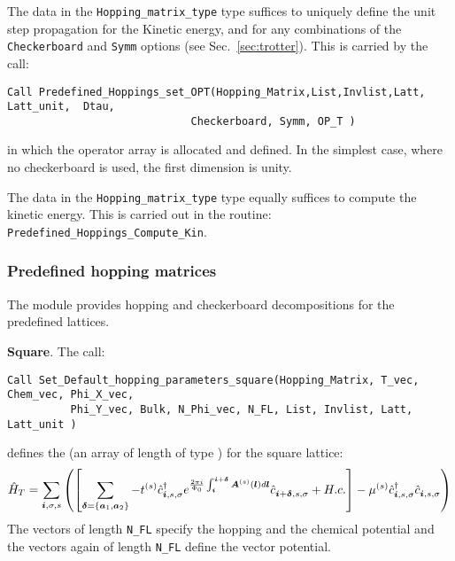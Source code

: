 The  data in the \texttt{Hopping\_matrix\_type} type suffices to uniquely define the  unit step propagation    for the Kinetic energy, and for  any combinations of the  \texttt{Checkerboard} and  \texttt{Symm}  options (see Sec.~\ref{sec:trotter}).   This is carried  by the call: 
\begin{lstlisting}[style=fortran]
Call Predefined_Hoppings_set_OPT(Hopping_Matrix,List,Invlist,Latt,  Latt_unit,  Dtau, 
                             Checkerboard, Symm, OP_T )
\end{lstlisting}
in which  the  operator   array     is  allocated and defined.    In the simplest  case, where no  checkerboard is  used, the  first dimension  is  unity. 

The   data in  the \texttt{Hopping\_matrix\_type} type   equally  suffices to compute  the kinetic energy.  This is carried out in the routine:  \texttt{Predefined\_Hoppings\_Compute\_Kin}.




\subsubsection{Predefined hopping  matrices}
The  module provides hopping   and  checkerboard decompositions for   the predefined lattices.   
 
 \noindent
 \textbf{Square}.     The call:
 \begin{lstlisting}[style=fortran]
 Call Set_Default_hopping_parameters_square(Hopping_Matrix, T_vec, Chem_vec, Phi_X_vec,  
          Phi_Y_vec, Bulk, N_Phi_vec, N_FL, List, Invlist, Latt, Latt_unit )
\end{lstlisting}
defines  the   (an array of length   of type  )    for the square  lattice: 
\begin{equation}
\hat{H}_T  =   \sum_{\boldsymbol{i}, \sigma, s}  \left( \left[ \sum_{ \boldsymbol{\delta} = \left\{ \boldsymbol{a}_1, \boldsymbol{a}_2\right\} }    - t^{(s)} \hat{c}^{\dagger}_{\boldsymbol{i},s,\sigma}   e^{\frac{2 \pi i}{\Phi_0} \int_{\boldsymbol{i}}^{\boldsymbol{i}+ \boldsymbol{\delta}}  \boldsymbol{A}^{(s)}(\boldsymbol{l})  d \boldsymbol{l}}   \hat{c}^{}_{\boldsymbol{i} + \boldsymbol{\delta},s,\sigma} +  H.c.   \right]    -  \mu^{(s)} \hat{c}^{\dagger}_{\boldsymbol{i},s,\sigma} \hat{c}^{}_{\boldsymbol{i},s,\sigma}  \right) 
\end{equation}
The vectors   of  length \texttt{N\_FL}    specify the hopping and the chemical potential   and the  vectors 
  again of  length  \texttt{N\_FL}    define the vector potential. 

